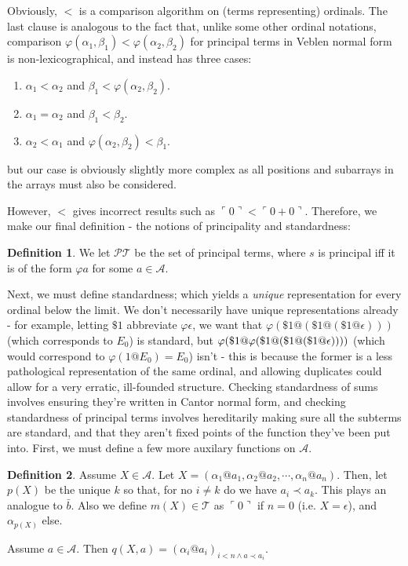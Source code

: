 \documentclass{article}
\theoremstyle{definition}
\newtheorem{definition}{Definition}[section]
\theoremstyle{plain}
\theoremstyle{plain}
\theoremstyle{plain}
\theoremstyle{plain}
\theoremstyle{remark}
\theoremstyle{remark}
\theoremstyle{remark}
\theoremstyle{plain}
\theoremstyle{plain}
\begin{document}
Obviously, $<$ is a comparison algorithm on (terms representing) ordinals. The last clause is analogous to the fact that, unlike some other ordinal notations, comparison $\varphi(\alpha_1, \beta_1) < \varphi(\alpha_2, \beta_2)$ for principal terms in Veblen normal form is non-lexicographical, and instead has three cases:

\begin{enumerate}
    \item $\alpha_1 < \alpha_2$ and $\beta_1 < \varphi(\alpha_2, \beta_2)$.
    \item $\alpha_1 = \alpha_2$ and $\beta_1 < \beta_2$.
    \item $\alpha_2 < \alpha_1$ and $\varphi(\alpha_2, \beta_2) < \beta_1$.
\end{enumerate}

but our case is obviously slightly more complex as all positions and subarrays in the arrays must also be considered.

However, $<$ gives incorrect results such as $\ulcorner 0 \urcorner < \ulcorner 0 + 0 \urcorner$. Therefore, we make our final definition - the notions of principality and standardness:

\begin{definition}
We let $\mathcal{PT}$ be the set of principal terms, where $s$ is principal iff it is of the form $\varphi a$ for some $a \in \mathcal{A}$.
\end{definition}

Next, we must define standardness; which yields a \textit{unique} representation for every ordinal below the limit. We don't necessarily have unique representations already - for example, letting $\$1$ abbreviate $\varphi \epsilon$, we want that $\varphi(\$1 @ (\$1 @ (\$1 @ \epsilon)))$ (which corresponds to $E_0$) is standard, but $\varphi(\$1 @ \varphi(\$1 @ (\$1 @ \\ (\$1 @ \epsilon))))$ (which would correspond to $\varphi(1 @ E_0) = E_0$) isn't - this is because the former is a less pathological representation of the same ordinal, and allowing duplicates could allow for a very erratic, ill-founded structure. Checking standardness of sums involves ensuring they're written in Cantor normal form, and checking standardness of principal terms involves hereditarily making sure all the subterms are standard, and that they aren't fixed points of the function they've been put into. First, we must define a few more auxilary functions on $\mathcal{A}$.

\begin{definition}
Assume $X \in \mathcal{A}$. Let $X = (\alpha_1 @ a_1, \alpha_2 @ a_2, \cdots, \alpha_n @ a_n)$. Then, let $p(X)$ be the unique $k$ so that, for no $i \neq k$ do we have $a_i \prec a_k$. This plays an analogue to $\bar{b}$. Also we define $m(X) \in \mathcal{T}$ as $\ulcorner 0 \urcorner$ if $n = 0$ (i.e. $X = \epsilon$), and $\alpha_{p(X)}$ else.

Assume $a \in \mathcal{A}$. Then $q(X, a) = (\alpha_i@a_i)_{i < n \land a \prec a_i}$.
\end{definition}
\end{document}
